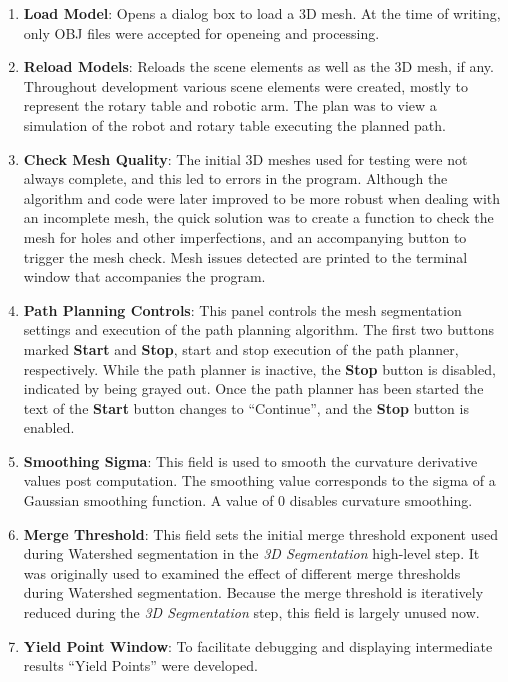 \begin{enumerate}
	\item \textbf{Load Model}: Opens a dialog box to load a 3D mesh.
		At the time of writing, only OBJ files were accepted for openeing and processing.
	\item \textbf{Reload Models}: Reloads the scene elements as well as the 3D mesh, if any.
		Throughout development various scene elements were created, mostly to represent the rotary table and robotic arm.
		The plan was to view a simulation of the robot and rotary table executing the planned path.
	\item \textbf{Check Mesh Quality}: The initial 3D meshes used for testing were not always complete, and this led to errors in the program.
		Although the algorithm and code were later improved to be more robust when dealing with an incomplete mesh, the quick solution was to create a function to check the mesh for holes and other imperfections, and an accompanying button to trigger the mesh check.
		Mesh issues detected are printed to the terminal window that accompanies the program.
	\item \textbf{Path Planning Controls}: This panel controls the mesh segmentation settings and execution of the path planning algorithm.
		The first two buttons marked \textbf{Start} and \textbf{Stop}, start and stop execution of the path planner, respectively.
		While the path planner is inactive, the \textbf{Stop} button is disabled, indicated by being grayed out.
		Once the path planner has been started the text of the \textbf{Start} button changes to ``Continue'', and the \textbf{Stop} button is enabled.
	\item \textbf{Smoothing Sigma}: This field is used to smooth the curvature derivative values post computation.
		The smoothing value corresponds to the sigma of a Gaussian smoothing function.
		A value of 0 disables curvature smoothing.
	\item \textbf{Merge Threshold}: This field sets the initial merge threshold exponent used during Watershed segmentation in the \textit{3D Segmentation} high-level step.
		It was originally used to examined the effect of different merge thresholds during Watershed segmentation.
		Because the merge threshold is iteratively reduced during the \textit{3D Segmentation} step, this field is largely unused now.
	\item \textbf{Yield Point Window}: To facilitate debugging and displaying intermediate results ``Yield Points'' were developed.

\end{enumerate}

